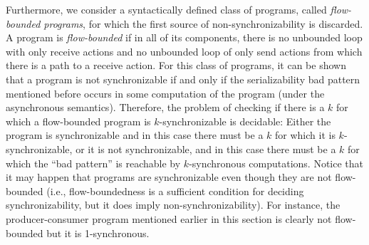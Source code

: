 Furthermore, we consider a syntactically defined class of programs, called {\em flow-bounded programs}, for which the first source of non-synchronizability is  discarded. A program is {\em flow-bounded} if in all of its components, there is no unbounded loop with only receive actions and no unbounded loop of only send actions from which there is a path to a receive action. For this class of programs, it can be shown that a program is not synchronizable if and only if the serializability bad pattern mentioned before occurs in some computation of the program (under the asynchronous semantics). Therefore, the problem of checking if there is a $k$ for which a flow-bounded program is $k$-synchronizable is decidable: Either the program is synchronizable and in this case there must be a $k$ for which it is $k$-synchronizable, or it is not synchronizable, and in this case there must be a $k$ for which the “bad pattern” is reachable by $k$-synchronous computations. Notice that it may happen that programs are synchronizable even though they are not flow-bounded (i.e., flow-boundedness is a sufficient condition for deciding synchronizability, but it does imply non-synchronizability). For instance, the producer-consumer program mentioned earlier in this section is clearly not flow-bounded but it is 1-synchronous. 

